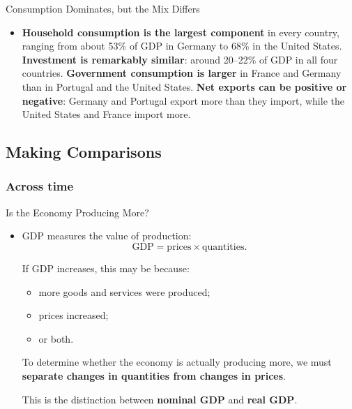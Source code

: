 \documentclass[10pt,aspectratio=169]{beamer}
\begin{document}
\begin{frame}{Consumption Dominates, but the Mix Differs}

\begin{itemize}
    \item \textbf{Household consumption is the largest component} in every country,
          ranging from about 53\% of GDP in Germany to 68\% in the United States.
    \itemvso \textbf{Investment is remarkably similar}: around 20--22\% of GDP in all
          four countries.
    \itemvso \textbf{Government consumption is larger} in France and Germany than in
          Portugal and the United States.
    \itemvso \textbf{Net exports can be positive or negative}: Germany and Portugal
          export more than they import, while the United States and France import more.
\end{itemize}

\end{frame}


\subsection{Making Comparisons}

\subsubsection{Across time}
\begin{frame}{Is the Economy Producing More?}

\begin{itemize}
    \item GDP measures the value of production:
    \[
    \text{GDP} = \text{prices} \times \text{quantities}.
    \]

    \itemvso If GDP increases, this may be because:
    \begin{itemize}
        \item more goods and services were produced;
        \item prices increased;
        \item or both.
    \end{itemize}

    \itemvso To determine whether the economy is actually producing more, we must
    \textbf{separate changes in quantities from changes in prices}.

    \itemvso This is the distinction between \textbf{nominal GDP} and
    \textbf{real GDP}.
\end{itemize}

\end{frame}
\end{document}
